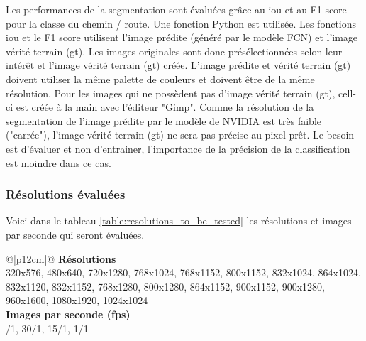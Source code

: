 \par Les performances de la segmentation sont évaluées grâce au \acrshort{iou} et au F1 score pour la classe du chemin / route. Une fonction Python est utilisée. Les fonctions \acrshort{iou} et le F1 score utilisent l'image prédite (généré par le modèle FCN) et l'image vérité terrain (\acrshort{gt}). Les images originales sont donc présélectionnées selon leur intérêt et l'image vérité terrain (\acrshort{gt}) créée. L'image prédite et vérité terrain (\acrshort{gt}) doivent utiliser la même palette de couleurs et doivent être de la même résolution. Pour les images qui ne possèdent pas d'image vérité terrain (\acrshort{gt}), cell-ci est créée à la main avec l'éditeur "Gimp". Comme la résolution de la segmentation de l'image prédite par le modèle de NVIDIA est très faible ("carrée"), l'image vérité terrain (\acrshort{gt}) ne sera pas précise au pixel prêt. Le besoin est d'évaluer et non d'entrainer, l'importance de la précision de la classification est moindre dans ce cas. 
\subsubsection{Résolutions évaluées}\label{section:resolutions_to_be_tested}
Voici dans le tableau \ref{table:resolutions_to_be_tested} les résolutions et images par seconde qui seront évaluées. 
{
    \renewcommand*{\arraystretch}{1.4}
    \begin{table}[ht]
    \centering
    \caption{Résolutions et images par seconde (\acrshort{fps}) qui seront évaluées}\label{table:resolutions_to_be_tested}
    \vspace{0.1em} %
    \begin{tabular}{{@{}|p{12cm}|@{}}}
         \hline
         \textbf{Résolutions}\\
         \hline
        320x576, 480x640, 720x1280, 768x1024, 768x1152, 800x1152, 832x1024, 864x1024, 832x1120, 832x1152, 768x1280, 800x1280, 864x1152, 900x1152, 900x1280, 960x1600, 1080x1920, 1024x1024\\
        \hline
        \textbf{Images par seconde (\acrshort{fps}) }\\
        /1, 30/1, 15/1, 1/1\\
        \hline
    \end{tabular}
    \end{table}
}